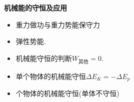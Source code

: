 \textbf{机械能的守恒及应用}
\begin{itemize}
\item 重力做功与重力势能\quad 保守力
\item 弹性势能.
\item 机械能守恒的判断\quad $W_{\text{其他}}=0$.
\item 单个物体的机械能守恒\quad $\Delta E_K=-\Delta E_p$
\item {}个物体的机械能守恒\quad (单体不守恒) %
\end{itemize}
